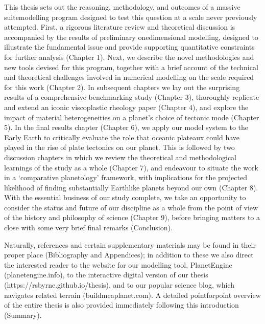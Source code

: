 \documentclass[letterpaper,10pt,english]{jupyterBook}
\begin{document}
\sphinxAtStartPar
This thesis sets out the reasoning, methodology, and outcomes of a massive suite\sphinxhyphen{}modelling program designed to test this question at a scale never previously attempted. First, a rigorous literature review and theoretical discussion is accompanied by the results of preliminary one\sphinxhyphen{}dimensional modelling, designed to illustrate the fundamental issue and provide supporting quantitative constraints for further analysis (Chapter 1). Next, we describe the novel methodologies and new tools devised for this program, together with a brief account of the technical and theoretical challenges involved in numerical modelling on the scale required for this work (Chapter 2). In subsequent chapters we lay out the surprising results of a comprehensive benchmarking study (Chapter 3), thoroughly replicate and extend an iconic viscoplastic rheology paper (Chapter 4), and explore the impact of material heterogeneities on a planet’s choice of tectonic mode (Chapter 5). In the final results chapter (Chapter 6), we apply our model system to the Early Earth to critically evaluate the role that oceanic plateaux could have played in the rise of plate tectonics on our planet. This is followed by two discussion chapters in which we review the theoretical and methodological learnings of the study as a whole (Chapter 7), and endeavour to situate the work in a ‘comparative planetology’ framework, with implications for the projected likelihood of finding substantially Earth\sphinxhyphen{}like planets beyond our own (Chapter 8). With the essential business of our study complete, we take an opportunity to consider the status and future of our discipline as a whole from the point of view of the history and philosophy of science (Chapter 9), before bringing matters to a close with some very brief final remarks (Conclusion).

\sphinxAtStartPar
Naturally, references and certain supplementary materials may be found in their proper place (Bibliography and Appendices); in addition to these we also direct the interested reader to the website for our modelling tool, PlanetEngine (planetengine.info), to the interactive digital version of our thesis (https://rsbyrne.github.io/thesis), and to our popular science blog, which navigates related terrain (buildmeaplanet.com). A detailed point\sphinxhyphen{}for\sphinxhyphen{}point overview of the entire thesis is also provided immediately following this introduction (Summary).
\end{document}
